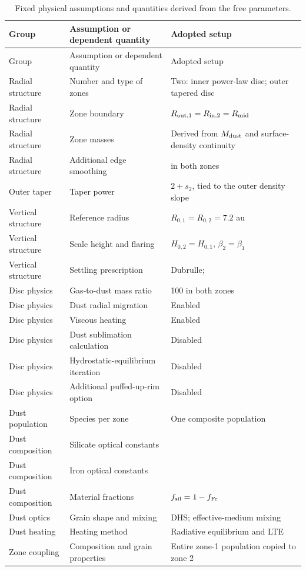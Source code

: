 \documentclass[11pt,a4paper]{article}
\newcommand{\code}[1]{\texttt{\detokenize{#1}}}
\begin{document}
\begin{longtable}{@{}P{2.7cm}P{4.5cm}P{8.6cm}@{}}
\caption{Fixed physical assumptions and quantities derived from the free parameters.}
\label{tab:fixed}\\
\toprule
Group & Assumption or dependent quantity & Adopted setup \\
\midrule
\endfirsthead
\toprule
Group & Assumption or dependent quantity & Adopted setup \\
\midrule
\endhead
\bottomrule
\endfoot
Radial structure & Number and type of zones & Two: inner power-law disc; outer tapered disc \\
Radial structure & Zone boundary & $R_{{\rm out},1}=R_{{\rm in},2}=R_{\rm mid}$ \\
Radial structure & Zone masses & Derived from $M_{\rm dust}$ and surface-density continuity \\
Radial structure & Additional edge smoothing & \code{edge = 0} in both zones \\
Outer taper & Taper power & $2+s_2$, tied to the outer density slope \\
Vertical structure & Reference radius & $R_{0,1}=R_{0,2}=7.2$ au \\
Vertical structure & Scale height and flaring & $H_{0,2}=H_{0,1}$, $\beta_2=\beta_1$ \\
Vertical structure & Settling prescription & Dubrulle; \code{dust_settling = 2} \\
Disc physics & Gas-to-dust mass ratio & 100 in both zones \\
Disc physics & Dust radial migration & Enabled \\
Disc physics & Viscous heating & Enabled \\
Disc physics & Dust sublimation calculation & Disabled \\
Disc physics & Hydrostatic-equilibrium iteration & Disabled \\
Disc physics & Additional puffed-up-rim option & Disabled \\
Dust population & Species per zone & One composite population \\
Dust composition & Silicate optical constants &  \\
Dust composition & Iron optical constants &  \\
Dust composition & Material fractions & $f_{\rm sil}=1-f_{\rm Fe}$ \\
Dust optics & Grain shape and mixing & DHS; effective-medium mixing \\
Dust heating & Heating method & Radiative equilibrium and LTE \\
Zone coupling & Composition and grain properties & Entire zone-1 population copied to zone 2 \\
\end{longtable}
\end{document}
